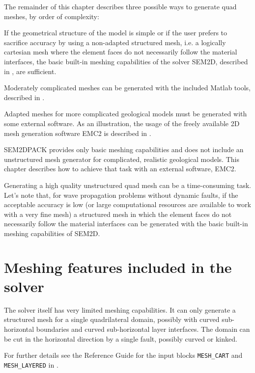 The remainder of this chapter describes three possible ways to generate quad meshes,
by order of complexity:
\begin{senumerate}
\item If the geometrical structure of the model is simple
or if the user prefers to sacrifice accuracy by using a non-adapted structured mesh,
i.e. a logically cartesian mesh 
where the element faces do not necessarily follow the material interfaces,
the basic built-in meshing capabilities of the solver SEM2D, described
in , are sufficient.
\item Moderately complicated meshes can be generated with the included Matlab tools,
described in .
\item Adapted meshes for more complicated geological models 
must be generated with some external software.
As an illustration, the usage of the freely available 2D mesh generation software EMC2 
is described in .
\end{senumerate}

SEM2DPACK provides only basic meshing capabilities
and does not include an unstructured mesh generator 
for complicated, realistic geological models. 
This chapter describes how to achieve that task with an external software, EMC2.

Generating a high quality unstructured quad mesh can be a time-consuming task.
Let's note that, for wave propagation problems without dynamic faults, 
if the acceptable accuracy is low
(or large computational resources are available to work with a very fine mesh)
a structured mesh in which the element faces do not necessarily follow the material interfaces
can be generated with the basic built-in meshing capabilities of SEM2D.

\section{Meshing features included in the solver}
\label{Sec:mesh_inc}

The solver itself has very limited meshing capabilities.
It can only generate a structured mesh for a single quadrilateral domain,
possibly with curved sub-horizontal boundaries and curved sub-horizontal layer interfaces.
The domain can be cut in the horizontal direction by a single fault, possibly curved or kinked.

For further details see the Reference Guide for the input blocks
\texttt{MESH\_CART} and  \texttt{MESH\_LAYERED} in .

